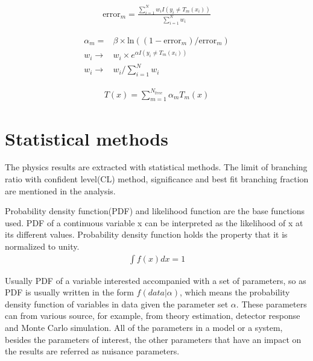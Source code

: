 \begin{align}\label{Equ.errorBDT} 
\textrm{error}_{m}=\frac{\sum_{i=1}^{N}w_{i}I(y_{i}\neq T_{m}(x_{i}))}{\sum_{i=1}^{N}w_{i}} 
\end{align}


\begin{align}\label{Equ.boostingweight} 
\alpha_{m}=&\beta\times \textrm{ln}((1-\textrm{error}_{m})/\textrm{error}_{m})\\
w_{i}\rightarrow &w_{i}\times e^{\alpha I(y_{i}\neq T_{m}(x_{i}))} \\
w_{i}\rightarrow &w_{i}/\sum_{i=1}^{N}w_{i}
\end{align}

\begin{align}\label{Equ.boostingeventweight} 
T(x)=\sum_{m=1}^{N_{tree}}\alpha_{m}T_{m}(x)
\end{align}



\section{Statistical methods}

The physics results are extracted with statistical methods. The limit of branching ratio with confident level(CL) method, significance and best fit branching fraction are mentioned in the analysis.  

Probability density function(PDF) and likelihood function are the base functions used. PDF of a continuous variable x can be interpreted as the likelihood of x at its different values. Probability density function holds the property that it is normalized to unity. 
\begin{align*}
\int f(x) dx =1
\end{align*}

Usually PDF of a variable interested accompanied with a set of parameters, so as PDF is usually written in the form $f(data|\alpha)$, which means the probability density function of variables in data  given the parameter set $\alpha$. These parameters can from various source, for example, from theory estimation, detector response and Monte Carlo simulation. All of the parameters in a model or a system, besides the parameters of interest, the other parameters that have an impact on the results are referred as nuisance parameters.       


